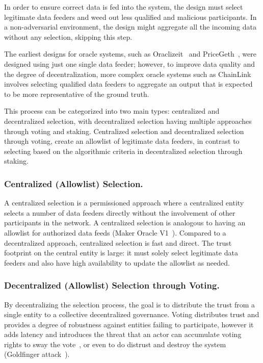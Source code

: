 In order to ensure correct data is fed into the system, the design must select legitimate data feeders and weed out less qualified and malicious participants. In a non-adversarial environment, the design might aggregate all the incoming data without any selection, skipping this step.

The earliest designs for oracle systems, such as Oraclizeit~\cite{bernanioraclize} and PriceGeth~\cite{eskandari2017feasibility}, were designed using just one single data feeder; however, to improve data quality and the degree of decentralization, more complex oracle systems such as ChainLink~\cite{ellis2017chainlink} involves selecting qualified data feeders to aggregate an output that is expected to be more representative of the ground truth.

This process can be categorized into two main types: centralized and decentralized selection, with decentralized selection having multiple approaches through voting and staking. Centralized selection and decentralized selection through voting, create an allowlist of legitimate data feeders, in contrast to selecting based on the algorithmic criteria in decentralized selection through staking. 

\subsubsection{Centralized (Allowlist) Selection.} A centralized selection is a permissioned approach where a centralized entity selects a number of data feeders directly without the involvement of other participants in the network. A centralized selection is analogous to having an allowlist for authorized data feeds (\eg Maker Oracle V1~\cite{MAKERDAOOracle}). 
Compared to a decentralized approach, centralized selection is fast and direct. The trust footprint on the central entity is large: it must solely select legitimate data feeders and also have high availability to update the allowlist as needed.


\subsubsection{Decentralized (Allowlist) Selection through Voting.} By decentralizing the selection process, the goal is to distribute the trust from a single entity to a collective decentralized governance.
Voting distributes trust and provides a degree of robustness against entities failing to participate, however it adds latency and introduces the threat that an actor can accumulate voting rights to sway the vote~\cite{makerdaoflashloanattack}, or even to do distrust and destroy the system (\eg Goldfinger attack~\cite{kroll2013economics}). 

